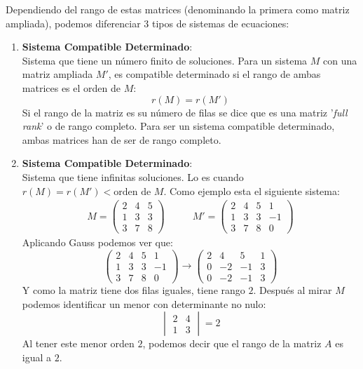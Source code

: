 \documentclass[arial,a4paper,print]{article}
\begin{document}
Dependiendo del rango de estas matrices (denominando la primera como matriz ampliada), podemos diferenciar $3$ tipos de sistemas de ecuaciones:
\begin{enumerate}
	\item \textbf{Sistema Compatible Determinado}:\\
	Sistema que tiene un número finito de soluciones. Para un sistema $M$ con una matriz ampliada $M'$, es compatible determinado si el rango de ambas matrices es el orden de $M$: \\
\begin{equation*}
	r(M) = r(M')
\end{equation*}
Si el rango de la matriz es su número de filas se dice que es una matriz '\textit{full rank}' o de rango completo. Para ser un sistema compatible determinado, ambas matrices han de ser de rango completo. 

	\item \textbf{Sistema Compatible Determinado}:\\
	Sistema que tiene infinitas soluciones. Lo es cuando $r(M) = r(M') < \text{orden de $M$}$. Como ejemplo esta el siguiente sistema:
\begin{align*}
	M = \begin{pmatrix}
		2 & 4 & 5 \\
		1 & 3 & 3 \\
		3 & 7 & 8 
	\end{pmatrix} & \qquad M' = \left(\begin{array}{lll|c}
	2 & 4 & 5 & 1 \\
	1 & 3 & 3 & -1 \\
	3 & 7 & 8 & 0 
\end{array}\right)
\end{align*}
Aplicando Gauss podemos ver que: 
\begin{equation*}
	\left(\begin{array}{lll|c}
		2 & 4 & 5 & 1 \\
		1 & 3 & 3 & -1 \\
		3 & 7 & 8 & 0 
	\end{array}\right) \rightarrow \left(\begin{array}{ccc|c}
	2 & 4 & 5 & 1 \\
	0 & -2 & -1 & 3 \\
	0 &-2 & -1 & 3 
\end{array}\right)
\end{equation*}
Y como la matriz tiene dos filas iguales, tiene rango $2$.
Después al mirar  $M$ podemos identificar un menor con determinante no nulo:
\begin{equation*}
	\begin{vmatrix}
		2 & 4 \\ 1 & 3 
	\end{vmatrix} = 2
\end{equation*}
Al tener este menor orden $2$, podemos decir que el rango de la matriz $A$ es igual a $2$.


\end{enumerate}
\end{document}
